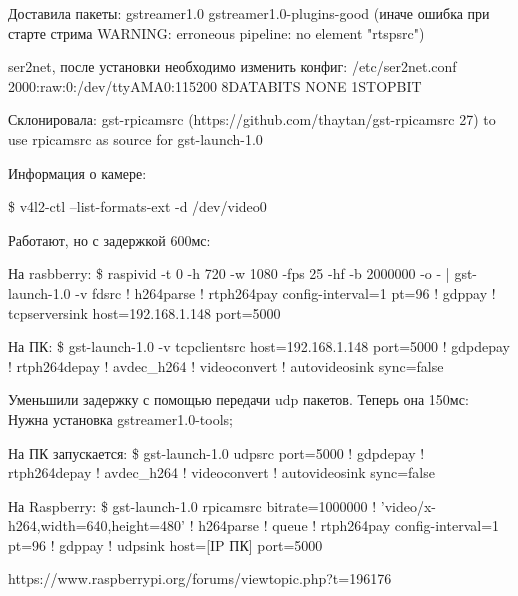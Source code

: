 \begin{MyCode}
	Доставила пакеты:
	gstreamer1.0 
	gstreamer1.0-plugins-good (иначе ошибка при старте стрима WARNING: erroneous pipeline: no element "rtspsrc")
	
	ser2net, после установки необходимо изменить конфиг:
	/etc/ser2net.conf
	2000:raw:0:/dev/ttyAMA0:115200 8DATABITS NONE 1STOPBIT
	
	Склонировала: gst-rpicamsrc (https://github.com/thaytan/gst-rpicamsrc 27) to use rpicamsrc as source for gst-launch-1.0
\end{MyCode}



Информация о камере:
\begin{MyCode}
\$ v4l2-ctl --list-formats-ext -d /dev/video0
\end{MyCode}

Работают, но с задержкой 600мс:
\begin{MyCode}
На rasbberry:
\$ raspivid -t 0 -h 720 -w 1080 -fps 25 -hf -b 2000000 -o - | gst-launch-1.0 -v fdsrc ! h264parse !  rtph264pay config-interval=1 pt=96 ! gdppay ! tcpserversink host=192.168.1.148 port=5000 

На ПК: 
\$ gst-launch-1.0 -v tcpclientsrc host=192.168.1.148 port=5000  ! gdpdepay !  rtph264depay ! avdec_h264 ! videoconvert ! autovideosink sync=false


\end{MyCode}

Уменьшили задержку с помощью передачи udp пакетов. Теперь она 150мс:
Нужна установка gstreamer1.0-tools;
\begin{MyCode}
На ПК запускается:
\$ gst-launch-1.0 udpsrc port=5000 ! gdpdepay ! rtph264depay ! avdec_h264 ! videoconvert ! autovideosink sync=false

На Raspberry:
\$ gst-launch-1.0 rpicamsrc bitrate=1000000 ! 'video/x-h264,width=640,height=480' ! h264parse ! queue ! rtph264pay config-interval=1 pt=96 ! gdppay ! udpsink host=[IP ПК] port=5000

https://www.raspberrypi.org/forums/viewtopic.php?t=196176
\end{MyCode}


